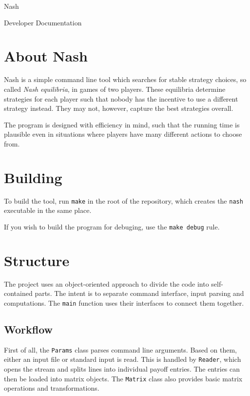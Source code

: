 \documentclass[a4paper,11pt]{article}
\begin{document}
\null
\vspace{4em}
\begin{center}
	{\Huge Nash}
	\vspace{2em}

	{\huge Developer Documentation}
\end{center}
\pagebreak

\tableofcontents
\pagebreak

\section{About Nash}

Nash is a simple command line tool which searches for stable strategy choices, so called \textit{Nash equilibria}, in games of two players. These equilibria determine strategies for each player such that nobody has the incentive to use a different strategy instead. They may not, however, capture the best strategies overall.

The program is designed with efficiency in mind, such that the running time is plausible even in situations where players have many different actions to choose from.

\section{Building}

To build the tool, run \verb|make| in the root of the repository, which creates the \verb|nash| executable in the same place.

If you wish to build the program for debuging, use the \verb|make debug| rule.

\section{Structure}

The project uses an object-oriented approach to divide the code into self-contained parts. The intent is to separate command interface, input parsing and computations. The \verb|main| function uses their interfaces to connect them together.

\subsection{Workflow}

First of all, the \verb|Params| class parses command line arguments. Based on them, either an input file or standard input is read. This is handled by \verb|Reader|, which opens the stream and splits lines into individual payoff entries. The entries can then be loaded into matrix objects. The \verb|Matrix| class also provides basic matrix operations and transformations.
\end{document}
